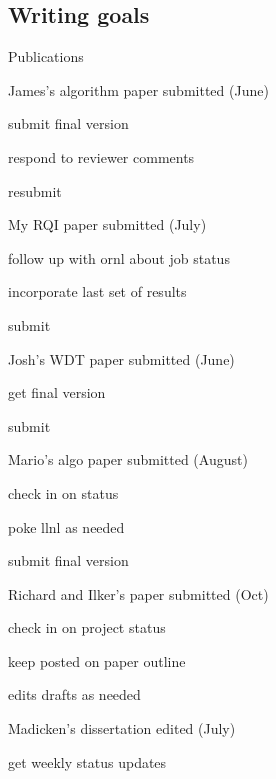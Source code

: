 \documentclass[12pt,twoside]{article}
\begin{document}
\subsection{Writing goals}
\begin{compactitem}
\item Publications
  \begin{compactitem}
  \item James's algorithm paper submitted (June)
     \begin{compactitem}
     \item submit final version
     \item respond to reviewer comments
     \item resubmit
     \end{compactitem}
  \item My RQI paper submitted (July)
     \begin{compactitem}
     \item follow up with ornl about job status
     \item incorporate last set of results
     \item submit
     \end{compactitem}
  \item Josh's WDT paper submitted (June)
     \begin{compactitem}
     \item get final version
     \item submit
     \end{compactitem}
  \item Mario's algo paper submitted (August)
     \begin{compactitem}
     \item check in on status
     \item poke llnl as needed
     \item submit final version
     \end{compactitem}
  \item Richard and Ilker's paper submitted (Oct)
     \begin{compactitem}
     \item check in on project status
     \item keep posted on paper outline
     \item edits drafts as needed
     \end{compactitem}
  \item Madicken's dissertation edited (July)
     \begin{compactitem}
     \item get weekly status updates

\end{compactitem}
\end{compactitem}
\end{compactitem}
\end{document}

